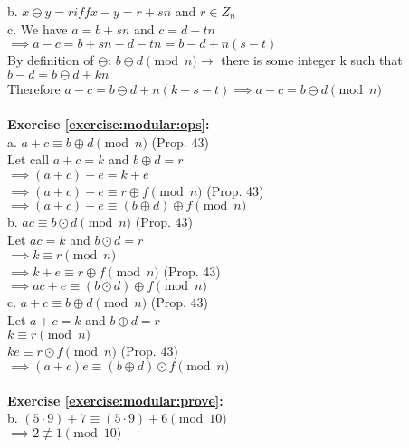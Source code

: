 b. $x \ominus y=r iff x-y=r+sn$ and $r \in Z_n$\\
c. We have $a=b+sn$ and $c=d+tn$\\
$\implies a-c=b+sn-d-tn=b-d+n(s-t)$\\
By definition of $\ominus$: $b \ominus d \pmod{n} \to$ there is some integer k such that $b-d=b \ominus d +kn$\\
Therefore $a-c=b \ominus d +n(k+s-t) \implies a-c=b \ominus d \pmod{n}$\\
\\
\textbf{Exercise \ref{exercise:modular:ops}:}\\
a. $a+c \equiv b \oplus d \pmod{n}$ (Prop. 43)\\
Let call $a+c=k$ and $b \oplus d=r$\\
$\implies (a+c)+e=k+e$\\
$\implies (a+c)+e \equiv r \oplus f \pmod{n}$ (Prop. 43)\\
$\implies (a+c)+e \equiv (b \oplus d) \oplus f \pmod{n}$\\
b. $ac \equiv b \odot d \pmod{n}$ (Prop. 43)\\
Let $ac=k$ and $b \odot d =r$\\
$\implies k \equiv r \pmod{n}$\\
$\implies k+e \equiv r \oplus f \pmod{n}$ (Prop. 43)\\
$\implies ac+e \equiv (b \odot d) \oplus f \pmod{n}$\\
c. $a+c \equiv b \oplus d \pmod{n}$ (Prop. 43)\\
Let $a+c=k$ and $b \oplus d =r$\\
$k \equiv r \pmod{n}$\\
$ke \equiv r \odot f \pmod{n}$ (Prop. 43)\\
$\implies (a+c)e \equiv (b \oplus d) \odot f \pmod{n}$\\
\\

\textbf{Exercise \ref{exercise:modular:prove}:}\\
b. $(5 \cdot 9)+7 \equiv (5 \cdot 9)+6 \pmod{10}$\\
$\implies 2 \not\equiv 1 \pmod{10}$\\

